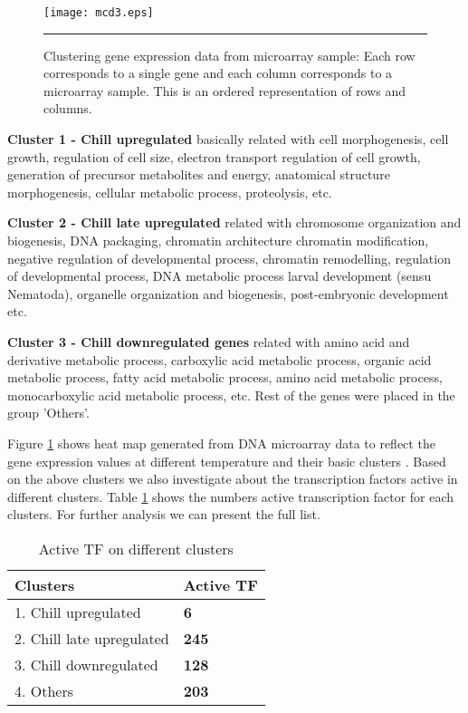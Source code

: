 \begin{figure}
	\centering
		\texttt{[image: mcd3.eps]}
		\rule{35em}{0.5pt}
	\caption[Clustering genes from microarray sample]
		{Clustering gene expression data from microarray sample: Each row corresponds to a single gene and each column corresponds to a microarray sample. This is an ordered representation of rows and columns.}
	\label{fig:Clustering_TF}
\end{figure}

\textbf{Cluster 1 - Chill upregulated} basically related with cell morphogenesis, cell growth, regulation of cell size, electron transport regulation of cell growth, generation of precursor metabolites and energy, anatomical structure morphogenesis, cellular metabolic process, proteolysis, etc.

\textbf{Cluster 2 - Chill late upregulated} related with chromosome organization and biogenesis, DNA packaging, chromatin architecture chromatin modification, negative regulation of developmental process, 
chromatin remodelling, regulation of developmental process, DNA metabolic process larval development (sensu Nematoda), organelle organization and biogenesis, post-embryonic development etc.

\textbf{Cluster 3 - Chill downregulated genes} related with amino acid and derivative metabolic process, carboxylic acid metabolic process, organic acid metabolic process, fatty acid metabolic process,
amino acid metabolic process, monocarboxylic acid metabolic process, etc.  Rest of the genes were placed in the group 'Others'. 

Figure \ref{fig:Clustering_TF} shows heat map generated from DNA microarray data to reflect the gene expression values at different temperature and their basic clusters \cite{Cossins:2007}. Based on the above clusters we also investigate about the transcription factors active in different clusters. Table \ref{table:Active_TF_diff_clusters} shows the numbers active transcription factor for each clusters.
For further analysis we can present the full list.

\begin{table}
  \centering
  \begin{tabular}{l l }
    \toprule
    \textbf{Clusters} & \textbf{Active TF} \\
    \midrule
    1. Chill upregulated & \bf 6 \\ 
    2. Chill late upregulated & \bf245 \\ 
    3. Chill downregulated & \bf128 \\
    4. Others & \bf 203 \\
  \bottomrule
  \end{tabular}
  \caption[Active TF on different clusters]
	  {Active TF on different clusters}
  \label{table:Active_TF_diff_clusters}
\end{table}

